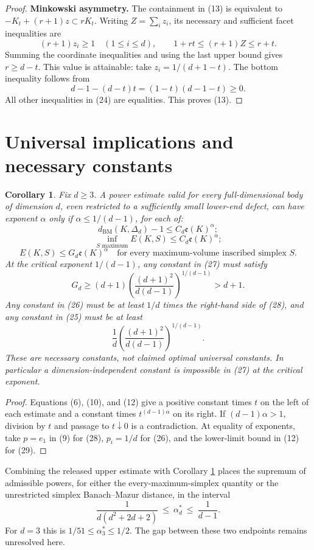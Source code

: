 \documentclass[11pt]{article}
\newtheorem{corollary}[theorem]{Corollary}
\newcommand{\BM}{d_{\mathrm{BM}}}
\newcommand{\ee}{\mathfrak e}
\begin{document}
\begin{proof}
\medskip\noindent\textbf{Minkowski asymmetry.}
The containment in (13) is equivalent to
$-K_t+(r+1)z\subset rK_t$. Writing $Z=\sum_i z_i$, its necessary and
sufficient facet inequalities are
\[
 (r+1)z_i\ge1\quad(1\le i\le d),\qquad
 1+rt\le(r+1)Z\le r+t.
 \tag{24}
\]
Summing the coordinate inequalities and using the last upper bound gives
$r\ge d-t$. This value is attainable: take
$z_i=1/(d+1-t)$. The bottom inequality follows from
\[
 d-1-(d-t)t=(1-t)(d-1-t)\ge0.
\]
All other inequalities in (24) are equalities. This proves (13).
\end{proof}

\section{Universal implications and necessary constants}

\begin{corollary}\label{cor:power}
Fix $d\ge3$. A power estimate valid for every full-dimensional body of
dimension $d$, even restricted to a sufficiently small lower-end defect,
can have exponent $\alpha$ only if $\alpha\le1/(d-1)$, for each of:
\[
 \BM(K,\Delta_d)-1\le C_d\ee(K)^\alpha;
 \tag{25}
\]
\[
 \inf_{S\text{ maximum}}E(K,S)\le C_d\ee(K)^\alpha;
 \tag{26}
\]
\[
 E(K,S)\le G_d\ee(K)^\alpha
 \quad\text{for every maximum-volume inscribed simplex }S.
 \tag{27}
\]
At the critical exponent $1/(d-1)$, any constant in (27) must satisfy
\[
 G_d\ge(d+1)\left(\frac{(d+1)^2}{d(d-1)}\right)^{1/(d-1)}>d+1.
 \tag{28}
\]
Any constant in (26) must be at least $1/d$ times the right-hand side of
(28), and any constant in (25) must be at least
\[
 \frac1d\left(\frac{(d+1)^2}{d(d-1)}\right)^{1/(d-1)}.
 \tag{29}
\]
These are necessary constants, not claimed optimal universal constants.
In particular a dimension-independent constant is impossible in (27)
at the critical exponent.
\end{corollary}

\begin{proof}
Equations (6), (10), and (12) give a positive constant times $t$ on the
left of each estimate and a constant times $t^{(d-1)\alpha}$ on its right.
If $(d-1)\alpha>1$, division by $t$ and passage to $t\downarrow0$ is a
contradiction. At equality of exponents, take $p=e_1$ in (9) for (28),
$p_i=1/d$ for (26), and the lower-limit bound in (12) for (29).
\end{proof}

Combining the released upper estimate with Corollary \ref{cor:power} places
the supremum of admissible powers, for either the every-maximum-simplex
quantity or the unrestricted simplex Banach--Mazur distance, in the interval
\[
 \frac1{d(d^2+2d+2)}\ \le\ \alpha_d^*\ \le\ \frac1{d-1}.
 \tag{29a}
\]
For $d=3$ this is $1/51\le\alpha_3^*\le1/2$. The gap between these
two endpoints remains unresolved here.
\end{document}
